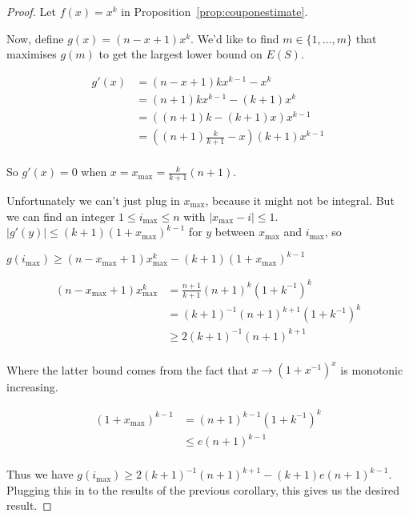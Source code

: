 \documentclass[a4paper]{book}
\begin{document}
\begin{proof}
Let \(f(x) = x^k\) in Proposition~\ref{prop:couponestimate}.

Now, define \(g(x) = (n - x + 1) x^k\).
We'd like to find \(m \in \{1, \ldots, m\}\) that maximises \(g(m)\) to get the largest lower bound on \(E(S)\).

\begin{align*}
g'(x) &= (n - x + 1) k x^{k - 1} - x^k\\
&= (n + 1) k x^{k - 1} - (k + 1) x^k\\
&= \left( (n + 1) k - (k + 1) x \right) x^{k - 1}\\
&= \left( (n + 1) \frac{k}{k + 1} - x \right)(k + 1) x^{k - 1}\\
\end{align*}

So \(g'(x) = 0\) when \(x = x_{\max} = \frac{k}{k + 1} (n + 1)\).

Unfortunately we can't just plug in \(x_{\max}\),
because it might not be integral.
But we can find an integer \(1 \leq i_{\max} \leq n\) with \(|x_{\max} - i| \leq 1\).
\(|g'(y)| \leq (k + 1){(1 + x_{\max})}^{k - 1}\) for \(y\) between \(x_{\max}\) and \(i_{\max}\),
so

\(g(i_{\max}) \geq (n - x_{\max} + 1)x_{\max}^{k} - (k + 1){(1 + x_{\max})}^{k - 1}\)

\begin{align*}
(n - x_{\max} + 1)x_{\max}^{k} &= \frac{n + 1}{k + 1} {(n + 1)}^k {(1 + k^{-1})}^k\\
&= {(k + 1)}^{-1} {(n + 1)}^{k + 1} {(1 + k^{-1})}^k\\
&\geq 2 {(k + 1)}^{-1} {(n + 1)}^{k + 1} \\
\end{align*}

Where the latter bound comes from the fact that \(x \to {(1 + x^{-1})}^x\) is monotonic increasing.

\begin{align*}
{(1 + x_{\max})}^{k - 1} &= {(n + 1)}^{k - 1} {(1 + k^{-1})}^k \\
&\leq e {(n + 1)}^{k - 1}\\ 
\end{align*}

Thus we have \(g(i_{\max}) \geq 2 {(k + 1)}^{-1} {(n + 1)}^{k + 1} - (k + 1) e {(n + 1)}^{k - 1}\).
Plugging this in to the results of the previous corollary,
this gives us the desired result.

\end{proof}
\end{document}
